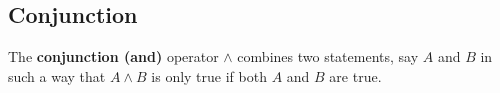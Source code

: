 \subsection{Conjunction}

\begin{defn}
  \label{defn:Conjunction}
  The \textbf{conjunction (and)} operator $\land$ combines two statements, say $A$ and $B$ in such a way that $A\land B$ is only true if both $A$ and $B$ are true. 
\end{defn}
